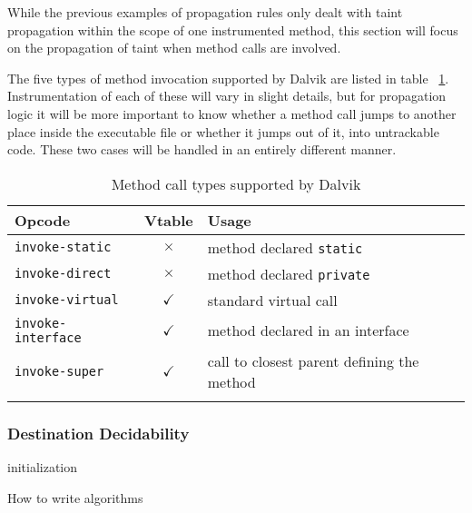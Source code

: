\documentclass[12pt,twoside,notitlepage]{report}
\newcommand{\tick}{$\checkmark$}
\newcommand{\cross}{$\times$}
\begin{document}
While the previous examples of propagation rules only dealt with taint propagation within the scope of one instrumented method, this section will focus on the propagation of taint when method calls are involved. 

The five types of method invocation supported by Dalvik are listed in table ~\ref{table:TaintPropagation_MethodCallTypes}. Instrumentation of each of these will vary in slight details, but for propagation logic it will be more important to know whether a method call jumps to another place inside the executable file or whether it jumps out of it, into untrackable code. These two cases will be handled in an entirely different manner. 

\begin{table}
	\begin{center}
	\begin{tabular}{|l|c|l|}
		\firsthline
		\textbf{Opcode}         & \textbf{Vtable} & \textbf{Usage} \\
		\hline
		\verb$invoke-static$    & \cross          & method declared \verb$static$ \\
		\verb$invoke-direct$    & \cross          & method declared \verb$private$ \\
		\hline
		\verb$invoke-virtual$   & \tick           & standard virtual call \\
		\verb$invoke-interface$ & \tick           & method declared in an interface \\
		\verb$invoke-super$     & \tick           & call to closest parent defining the method \\
		\lasthline
	\end{tabular}
	\end{center}
	\caption{Method call types supported by Dalvik}
	\label{table:TaintPropagation_MethodCallTypes}
\end{table}


\subsubsection{Destination Decidability}


\begin{algorithm}[H]
 initialization\;
 \caption{How to write algorithms}
\end{algorithm}
\end{document}
